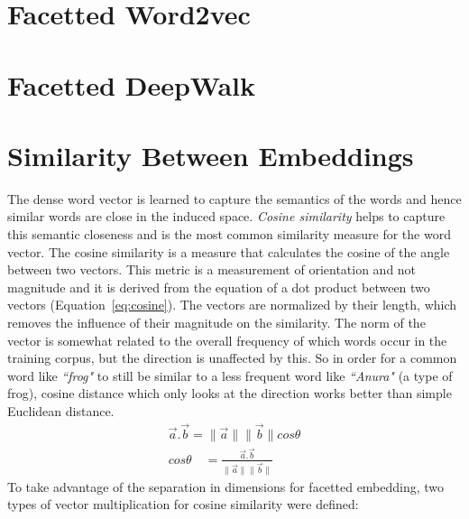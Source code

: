 \section{Facetted Word2vec}\label{sec:facetted_word2vec}
\section{Facetted DeepWalk}\label{sec:facetted_deepwalk}


\section{Similarity Between Embeddings }
The dense word vector is learned to capture the semantics of the words and hence similar words are close in the induced space. \emph{Cosine similarity} helps to capture this semantic closeness and is the most common similarity measure for the word vector. The cosine similarity is a measure that calculates the cosine of the angle between two vectors. This metric is a measurement of orientation and not magnitude and it is derived from the equation of a dot product between two vectors (Equation~\ref{eq:cosine}). The vectors are normalized by their length, which removes the influence of their magnitude on the similarity. The norm of the vector is somewhat related to the overall frequency of which words occur in the training corpus, but the direction is unaffected by this. So in order for a common word like \emph{``frog"} to still be similar to a less frequent word like \emph{``Anura"} (a type of frog), cosine distance which only looks at the direction works better than simple Euclidean distance.
\begin{equation}
\begin{split}
\overrightarrow { a } .\overrightarrow { b } =\parallel \overrightarrow { a } \parallel \parallel \overrightarrow { b } \parallel cos\theta 
\\
cos\theta \quad =\frac { \overrightarrow { a } .\overrightarrow { b }  }{ \parallel \overrightarrow { a } \parallel \parallel \overrightarrow { b } \parallel  } \quad
\end{split}
\label{eq:cosine}
\end{equation}
\noindent
To take advantage of the separation in dimensions for facetted embedding, two types of vector multiplication for cosine similarity were defined: 
